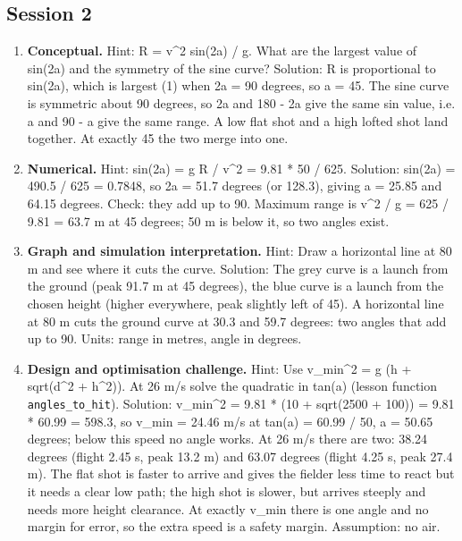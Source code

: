 \documentclass[11pt,a4paper]{article}
\begin{document}
\subsection*{Session 2}
\begin{enumerate}[nosep]
\item \textbf{Conceptual.} Hint: R = v\textasciicircum{}2 sin(2a) / g. What are the largest value of sin(2a) and the symmetry of the sine curve? Solution: R is proportional to sin(2a), which is largest (1) when 2a = 90 degrees, so a = 45. The sine curve is symmetric about 90 degrees, so 2a and 180 - 2a give the same sin value, i.e. a and 90 - a give the same range. A low flat shot and a high lofted shot land together. At exactly 45 the two merge into one.
\item \textbf{Numerical.} Hint: sin(2a) = g R / v\textasciicircum{}2 = 9.81 * 50 / 625. Solution: sin(2a) = 490.5 / 625 = 0.7848, so 2a = 51.7 degrees (or 128.3), giving a = 25.85 and 64.15 degrees. Check: they add up to 90. Maximum range is v\textasciicircum{}2 / g = 625 / 9.81 = 63.7 m at 45 degrees; 50 m is below it, so two angles exist.
\item \textbf{Graph and simulation interpretation.} Hint: Draw a horizontal line at 80 m and see where it cuts the curve. Solution: The grey curve is a launch from the ground (peak 91.7 m at 45 degrees), the blue curve is a launch from the chosen height (higher everywhere, peak slightly left of 45). A horizontal line at 80 m cuts the ground curve at 30.3 and 59.7 degrees: two angles that add up to 90. Units: range in metres, angle in degrees.
\item \textbf{Design and optimisation challenge.} Hint: Use v\_min\textasciicircum{}2 = g (h + sqrt(d\textasciicircum{}2 + h\textasciicircum{}2)). At 26 m/s solve the quadratic in tan(a) (lesson function \texttt{angles\_to\_hit}). Solution: v\_min\textasciicircum{}2 = 9.81 * (10 + sqrt(2500 + 100)) = 9.81 * 60.99 = 598.3, so v\_min = 24.46 m/s at tan(a) = 60.99 / 50, a = 50.65 degrees; below this speed no angle works. At 26 m/s there are two: 38.24 degrees (flight 2.45 s, peak 13.2 m) and 63.07 degrees (flight 4.25 s, peak 27.4 m). The flat shot is faster to arrive and gives the fielder less time to react but it needs a clear low path; the high shot is slower, but arrives steeply and needs more height clearance. At exactly v\_min there is one angle and no margin for error, so the extra speed is a safety margin. Assumption: no air.
\end{enumerate}
\end{document}
